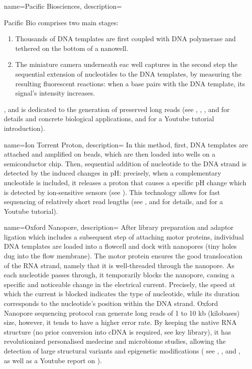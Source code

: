 {name=Pacific Biosciences,
description={ 
Pacific Bio comprises two main stages:
\begin{enumerate}
\item  Thousands of DNA templates are first coupled with DNA polymerase and tethered on the bottom of a nanowell.
\item The miniature camera underneath eac well captures in the second step the sequential extension of nucleotides
to the DNA templates, by measuring the resulting fluorescent reactions: when a base pairs with the DNA template,
 its signal's intensity increases.
\end{enumerate}, and is dedicated to the generation of preserved long reads 
(see \autocite{mohammed_etal22}, \autocite{nakakawa20}, \autocite{lausanne20}, 
\autocite{groot-kormelink_etal16} and \autocite{rhoads_au15} for details and concrete biological applications, 
and \autocite{haemse11} for a Youtube tutorial introduction).
}}

{name=Ion Torrent Proton,
description={ 
In this method, first, DNA templates are attached and amplified on beads, which are then loaded into wells on a semiconductor chip. 
Then, sequential addition of nucleotide to the DNA strand is detected by the induced changes in pH: precisely, when a complementary nucleotide 
is included, it releases a proton that causes a specific pH change which is detected by ion-sensitive sensors (see \autocite[Fig. 3]{kchouk_etal17}).
 This technology allows for fast sequencing of relatively short read lengths 
 (see \autocite{nguyen21}, \autocite{kchouk_etal17} and \autocite{golan_medvedev13} for details, and \autocite{bio-resource20} for a Youtube tutorial).
}}

{name=Oxford Nanopore,
description={ 
After library preparation and adaptor ligation which includes a subsequent step of attaching motor proteins, 
individual DNA templates are loaded into a flowcell and dock with nanopores (tiny holes dug into the flow membrane). 
The motor protein ensures the good translocation of the RNA strand, namely that it is well-threaded through  the nanopore. 
As each nucleotide passes through, it temporarily blocks the nanopore, causing a specific and noticeable change in the electrical current. 
Precisely, the speed at which the current is blocked indicates the type of nucleotide, while its duration 
corresponds to the nucleotide's position within the DNA strand. Oxford Nanopore sequencing protocol can generate long reads of 1 to 10 kb (kilobases) size, 
however, it tends to have a higher error rate. 
By keeping the native RNA structure (no prior conversion into cDNA is required, see key \gls{library}), it has revolutionized 
personalised medecine and microbiome studies, allowing the detection of large structural variants and epigenetic modifications (
see \autocite{mackenzie_argyropoulos23}, \autocite{lin_etal21}, \autocite{maitra_etal12}
and \autocite{lu_etal16}, as well as a Youtube report on \autocite{nationaldnadatabase16}).
}}



